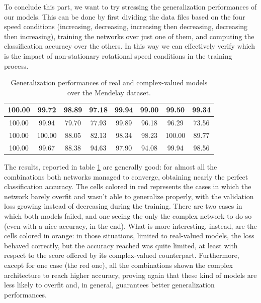 \documentclass[../main.tex]{subfiles}
\begin{document}
To conclude this part, we want to try stressing the generalization performances of our models. This can be done by first dividing the data files based on the four speed conditions (increasing, decreasing, increasing then decreasing, decreasing then increasing), training the networks over just one of them, and computing the classification accuracy over the others. In this way we can effectively verify which is the impact of non-stationary rotational speed conditions in the training process.
\begin{table}[!ht]
	\centering
	\begin{tabular}{||c|c||c|c||c|c||c|c||}
		\toprule
		100.00 & 99.72 & 98.89 & 97.18 & 99.94 & 99.00 & 99.50 & 99.34\\
		\midrule
		100.00 & 99.94 & \cellcolor{red} 79.70 & \cellcolor{red} 77.93 & 99.89 & 96.18 & 96.29 & \cellcolor{orange} 73.56\\
		\midrule
		100.00 & 100.00 & \cellcolor{red} 88.05 & \cellcolor{red} 82.13 & 98.34 & 98.23 & 100.00 & \cellcolor{orange} 89.77\\
		\midrule
		100.00 & 99.67 & \cellcolor{red} 88.38 & 94.63 & 97.90 & 94.08 & 99.94 & 98.56\\
		\bottomrule
	\end{tabular}
	\caption{Generalization performances of real and complex-valued models over the Mendelay dataset.}
	\label{tab:mendeley_generalization}
\end{table}
The results, reported in table \ref{tab:mendeley_generalization} are generally good: for almost all the combinations both networks managed to converge, obtaining nearly the perfect classification accuracy. The cells colored in red represents the cases in which the network barely overfit and wasn't able to generalize properly, with the validation loss growing instead of decreasing during the training. There are two cases in which both models failed, and one seeing the only the complex network to do so (even with a nice accuracy, in the end). What is more interesting, instead, are the cells colored in orange: in those situations, limited to real-valued models, the loss behaved correctly, but the accuracy reached was quite limited, at least with respect to the score offered by its complex-valued counterpart. Furthermore, except for one case (the red one), all the combinations shown the complex architecture to reach higher accuracy, proving again that these kind of models are less likely to overfit and, in general, guarantees better generalization performances.




	
\end{document}
